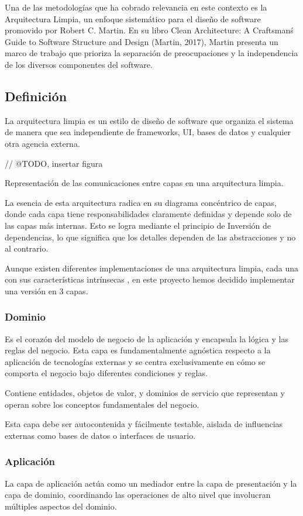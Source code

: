 Una de las metodologías que ha cobrado relevancia en este contexto es la Arquitectura Limpia,
un enfoque sistemático para el diseño de software promovido por
Robert C. Martin. En su libro Clean Architecture: A Craftsman\'s Guide to Software Structure and Design (Martin,
2017), Martin presenta un marco de trabajo que prioriza la separación de preocupaciones y la independencia de los
diversos componentes del software.

\subsection*{Definición}
La arquitectura limpia es un estilo de diseño de software que
organiza el sistema de manera que sea independiente de frameworks, UI, bases de datos y cualquier otra agencia externa.

// @TODO, insertar figura

Representación de las comunicaciones entre capas en una arquitectura limpia.

La esencia de esta arquitectura radica en su diagrama concéntrico de capas, donde cada capa tiene responsabilidades
claramente definidas y depende solo de las capas más internas.
Esto se logra mediante el principio de Inversión de dependencias, lo que significa que los detalles dependen de las
abstracciones y no al contrario.

Aunque existen diferentes implementaciones de una arquitectura limpia, cada una con sus características intrínsecas
, en este proyecto hemos decidido implementar una versión en 3 capas.

\subsubsection*{Dominio}
Es el corazón del modelo de negocio de la aplicación y encapsula la
lógica y las reglas del negocio. Esta capa es fundamentalmente
agnóstica respecto a la aplicación de tecnologías externas y se
centra exclusivamente en cómo se comporta el negocio bajo diferentes condiciones y reglas.

Contiene entidades, objetos de valor, y dominios de servicio que representan y operan sobre los
conceptos fundamentales del negocio.

Esta capa debe ser autocontenida y fácilmente testable, aislada de influencias externas como bases de
datos o interfaces de usuario.

\subsubsection*{Aplicación}
La capa de aplicación actúa como un mediador entre la capa de presentación y la capa de dominio, coordinando
las operaciones de alto nivel que involucran múltiples aspectos del dominio.

